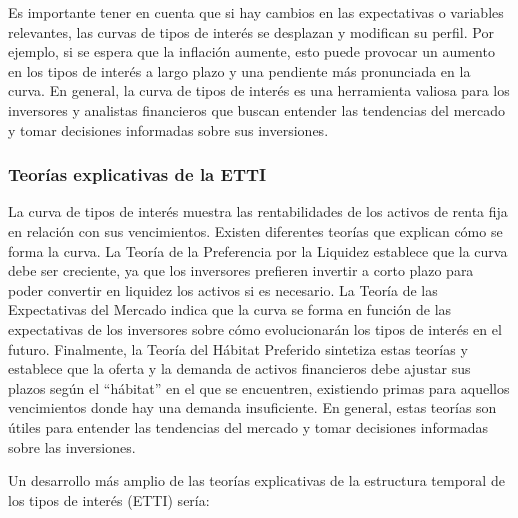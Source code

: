 \documentclass[
  letterpaper,
  DIV=11,
  numbers=noendperiod]{scrartcl}
\begin{document}
Es importante tener en cuenta que si hay cambios en las expectativas o
variables relevantes, las curvas de tipos de interés se desplazan y
modifican su perfil. Por ejemplo, si se espera que la inflación aumente,
esto puede provocar un aumento en los tipos de interés a largo plazo y
una pendiente más pronunciada en la curva. En general, la curva de tipos
de interés es una herramienta valiosa para los inversores y analistas
financieros que buscan entender las tendencias del mercado y tomar
decisiones informadas sobre sus inversiones.

\hypertarget{teoruxedas-explicativas-de-la-etti}{%
\subsubsection{Teorías explicativas de la
ETTI}\label{teoruxedas-explicativas-de-la-etti}}

La curva de tipos de interés muestra las rentabilidades de los activos
de renta fija en relación con sus vencimientos. Existen diferentes
teorías que explican cómo se forma la curva. La Teoría de la Preferencia
por la Liquidez establece que la curva debe ser creciente, ya que los
inversores prefieren invertir a corto plazo para poder convertir en
liquidez los activos si es necesario. La Teoría de las Expectativas del
Mercado indica que la curva se forma en función de las expectativas de
los inversores sobre cómo evolucionarán los tipos de interés en el
futuro. Finalmente, la Teoría del Hábitat Preferido sintetiza estas
teorías y establece que la oferta y la demanda de activos financieros
debe ajustar sus plazos según el ``hábitat'' en el que se encuentren,
existiendo primas para aquellos vencimientos donde hay una demanda
insuficiente. En general, estas teorías son útiles para entender las
tendencias del mercado y tomar decisiones informadas sobre las
inversiones.

Un desarrollo más amplio de las teorías explicativas de la estructura
temporal de los tipos de interés (ETTI) sería:
\end{document}
